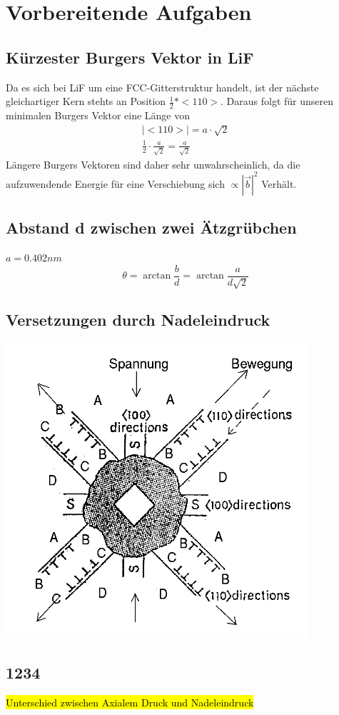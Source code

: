 \section{Vorbereitende Aufgaben}
    \subsection{Kürzester Burgers Vektor in LiF}
        Da es sich bei LiF um eine FCC-Gitterstruktur handelt, ist der nächste gleichartiger Kern stehts an Position $\frac{1}{2} * <110>$. Daraus folgt für unseren minimalen
        Burgers Vektor eine Länge von
        \begin{align}
            |<110>| = a \cdot \sqrt{2} \\
            \frac{1}{2} \cdot \frac{a}{\sqrt{2}} = \frac{a}{\sqrt{2}}
        \end{align}
        Längere Burgers Vektoren sind daher sehr unwahrscheinlich, da die aufzuwendende Energie für eine Verschiebung sich $\propto |\vec{b}|^2$ Verhält.
    \subsection{Abstand d zwischen zwei Ätzgrübchen}
        $a = 0.402nm$
        \begin{equation}
            \theta = \arctan{\frac{b}{d}} = \arctan{\frac{a}{d \sqrt{2}}}
        \end{equation}
    \subsection{Versetzungen durch Nadeleindruck}
        \includegraphics{Images/Question3.PNG}
    \subsection{1234}
        \hl{Unterschied zwischen Axialem Druck und Nadeleindruck}